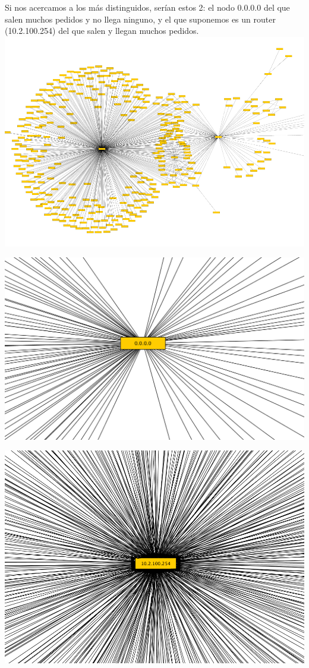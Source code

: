 \newpage
\indent Si nos acercamos a los más distinguidos, serían estos 2: el nodo 0.0.0.0 del que salen muchos pedidos y no llega ninguno, y el que suponemos es un router (10.2.100.254) del que salen y llegan muchos pedidos.\\

\includegraphics[scale=0.5,clip=true,trim=140 0 0 0]{graphics/distinguidos.png}

\includegraphics[scale=0.3,clip=true,trim=140 0 0 0]{graphics/distinguido_todos_ceros.png}

\includegraphics[scale=0.3,clip=true,trim=140 0 0 0]{graphics/distinguido_router.png}

